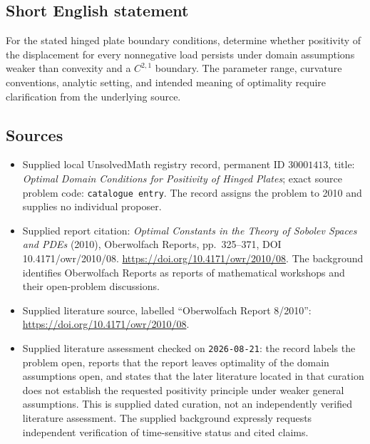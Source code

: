 \documentclass[11pt]{article}
\begin{document}
\subsection{Short English statement}
For the stated hinged plate boundary conditions, determine whether positivity of the displacement for every nonnegative load persists under domain assumptions weaker than convexity and a \(C^{2,1}\) boundary. The parameter range, curvature conventions, analytic setting, and intended meaning of optimality require clarification from the underlying source.
\subsection{Sources}
\begin{itemize}
\item Supplied local UnsolvedMath registry record, permanent ID \(30001413\), title: \emph{Optimal Domain Conditions for Positivity of Hinged Plates}; exact source problem code: \texttt{catalogue entry}. The record assigns the problem to 2010 and supplies no individual proposer.
\item Supplied report citation: \emph{Optimal Constants in the Theory of Sobolev Spaces and PDEs} (2010), Oberwolfach Reports, pp.\ 325--371, DOI 10.4171/owr/2010/08. \url{https://doi.org/10.4171/owr/2010/08}. The background identifies Oberwolfach Reports as reports of mathematical workshops and their open-problem discussions.
\item Supplied literature source, labelled ``Oberwolfach Report 8/2010'': \url{https://doi.org/10.4171/owr/2010/08}.
\item Supplied literature assessment checked on \texttt{2026-08-21}: the record labels the problem open, reports that the report leaves optimality of the domain assumptions open, and states that the later literature located in that curation does not establish the requested positivity principle under weaker general assumptions. This is supplied dated curation, not an independently verified literature assessment. The supplied background expressly requests independent verification of time-sensitive status and cited claims.
\end{itemize}
\end{document}
